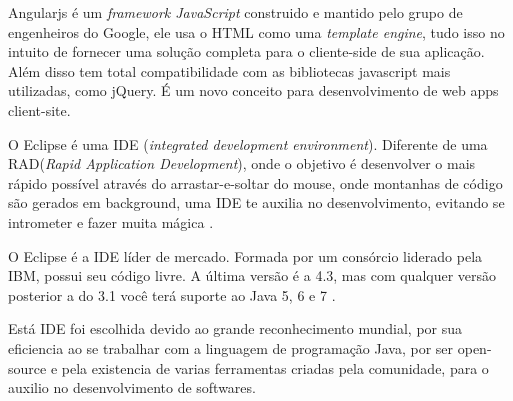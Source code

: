 \documentclass{abntpuc}
\begin{document}
Angularjs é um \textit{framework JavaScript} construido e mantido pelo grupo de engenheiros do Google, ele usa o HTML como uma \textit{template engine}, tudo isso no intuito de fornecer uma solução completa para o cliente-side de sua aplicação. Além disso tem total compatibilidade com as bibliotecas javascript mais utilizadas, como jQuery. É um novo conceito para desenvolvimento de web apps client-site.\cite{angularjs}\par


O Eclipse é uma IDE (\textit{integrated development environment}). Diferente de uma RAD(\textit{Rapid Application Development}), onde o objetivo é desenvolver o mais rápido possível através do arrastar-e-soltar do mouse, onde montanhas de código são gerados em background, uma IDE te auxilia no desenvolvimento, evitando se intrometer e fazer muita mágica \cite{caelum}.\par

O Eclipse é a IDE líder de mercado. Formada por um consórcio liderado pela IBM, possui seu código livre. A última versão é a 4.3, mas com qualquer versão posterior a do 3.1 você terá suporte ao Java 5, 6 e 7 \cite{caelum}.\par

Está IDE foi escolhida devido ao grande reconhecimento mundial, por sua eficiencia ao se trabalhar com a linguagem de programação Java, por ser open-source e pela existencia de varias ferramentas criadas pela comunidade, para o auxilio no desenvolvimento de softwares.\par

%
%
%
\end{document}
